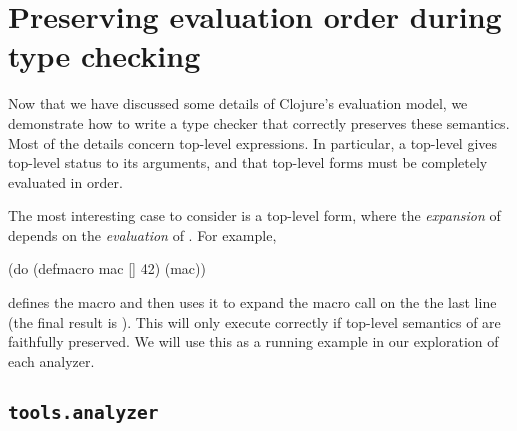 \section{Preserving evaluation order during type checking}

Now that we have discussed some details of Clojure's evaluation model,
we demonstrate how to write a type checker that correctly preserves
these semantics.
Most of the details concern top-level expressions. In particular,
a top-level  gives top-level status to its arguments, and
that top-level forms must be completely evaluated in order.

The most interesting case to consider is a top-level  form,
where the
\emph{expansion} of 
depends on the \emph{evaluation} of .
For example,

{
\lstset{numbers=left}
\begin{cljlisting}
(do (defmacro mac [] 42)
    (mac))
\end{cljlisting}
}

defines the macro  and then uses it to expand
the macro call on the the last line (the final result is ).
This will only execute correctly if top-level semantics of  
are faithfully preserved.
We will use this as a running example in our exploration of
each analyzer.

\subsection{\texttt{tools.analyzer}}

